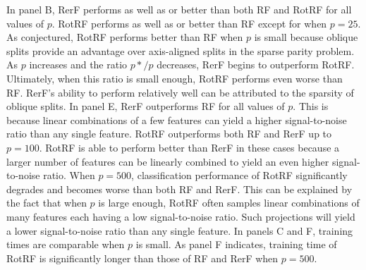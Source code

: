 \documentclass{article}
\begin{document}
In panel B, RerF performs as well as or better than both RF and RotRF for all values of $p$. RotRF performs as well as or better than RF except for when $p = 25$. As conjectured, RotRF performs better than RF when $p$ is small because oblique splits provide an advantage over axis-aligned splits in the sparse parity problem. As $p$ increases and the ratio $p*/p$ decreases, RerF begins to outperform RotRF. Ultimately, when this ratio is small enough, RotRF performs even worse than RF. RerF's ability to perform relatively well can be attributed to the sparsity of oblique splits. In panel E, RerF outperforms RF for all values of $p$. This is because linear combinations of a few features can yield a higher signal-to-noise ratio than any single feature. RotRF outperforms both RF and RerF up to $p = 100$. RotRF is able to perform better than RerF in these cases because a larger number of features can be linearly combined to yield an even higher signal-to-noise ratio. When $p = 500$, classification performance of RotRF significantly degrades and becomes worse than both RF and RerF. This can be explained by the fact that when $p$ is large enough, RotRF often samples linear combinations of many features each having a low signal-to-noise ratio. Such projections will yield a lower signal-to-noise ratio than any single feature. In panels C and F, training times are comparable when $p$ is small. As panel F indicates, training time of RotRF is significantly longer than those of RF and RerF when $p = 500$. 
\end{document}
